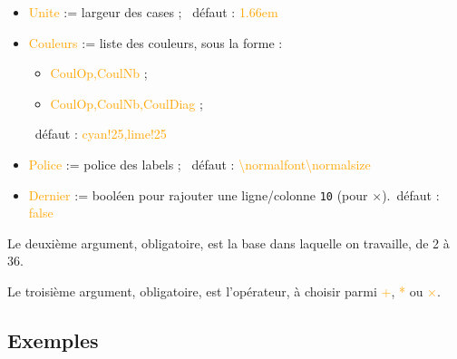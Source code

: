 \documentclass[french,a4paper,11pt]{article}
\newcommand\Cle[1]{{\small\sffamily\textlangle \textcolor{orange}{#1}\textrangle}}
\begin{document}
{{\begin{tipblock}
\begin{itemize}
	\item \Cle{Unite} := largeur des cases ; \hfill~défaut : \Cle{1.66em}
	\item \Cle{Couleurs} := liste des couleurs, sous la forme :
	\begin{itemize}
		\item \Cle{CoulOp,CoulNb} ;
		\item \Cle{CoulOp,CoulNb,CoulDiag} ;
	\end{itemize}
	\hfill~défaut : \Cle{cyan!25,lime!25}
	\item \Cle{Police} := police des labels ; \hfill~défaut : \Cle{\textbackslash normalfont\textbackslash  normalsize}
	\item \Cle{Dernier} := booléen pour rajouter une ligne/colonne \texttt{10} (pour $\mathtt{×}$).\hfill~défaut : \Cle{false}
\end{itemize}

Le deuxième argument, obligatoire, est la base dans laquelle on travaille, de 2 à 36.

\smallskip

Le troisième argument, obligatoire, est l'opérateur, à choisir parmi \Cle{+}, \Cle{*} ou \Cle{×}.
\end{tipblock}

\subsection{Exemples}

\begin{DemoCode}[]
\end{DemoCode}

\begin{DemoCode}[]
\end{DemoCode}

\begin{DemoCode}[]
\end{DemoCode}

\begin{DemoCode}[]
\end{DemoCode}

\begin{DemoCode}[]
\end{DemoCode}

\pagebreak

}}
\end{document}
